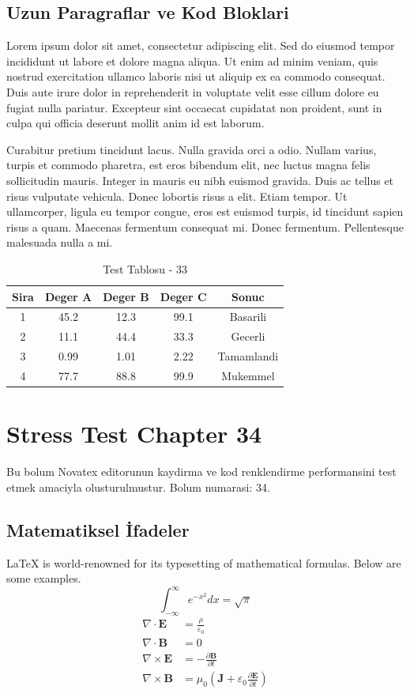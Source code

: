 \documentclass[12pt,a4paper]{article}
\begin{document}
\subsection{Uzun Paragraflar ve Kod Bloklari}
Lorem ipsum dolor sit amet, consectetur adipiscing elit. Sed do eiusmod tempor incididunt ut labore et dolore magna aliqua. Ut enim ad minim veniam, quis nostrud exercitation ullamco laboris nisi ut aliquip ex ea commodo consequat. Duis aute irure dolor in reprehenderit in voluptate velit esse cillum dolore eu fugiat nulla pariatur. Excepteur sint occaecat cupidatat non proident, sunt in culpa qui officia deserunt mollit anim id est laborum.

Curabitur pretium tincidunt lacus. Nulla gravida orci a odio. Nullam varius, turpis et commodo pharetra, est eros bibendum elit, nec luctus magna felis sollicitudin mauris. Integer in mauris eu nibh euismod gravida. Duis ac tellus et risus vulputate vehicula. Donec lobortis risus a elit. Etiam tempor. Ut ullamcorper, ligula eu tempor congue, eros est euismod turpis, id tincidunt sapien risus a quam. Maecenas fermentum consequat mi. Donec fermentum. Pellentesque malesuada nulla a mi.

\begin{table}[h!]
\centering
\begin{tabular}{|c|c|c|c|c|}
\hline
\textbf{Sira} & \textbf{Deger A} & \textbf{Deger B} & \textbf{Deger C} & \textbf{Sonuc} \\
\hline
1 & 45.2 & 12.3 & 99.1 & Basarili \\
2 & 11.1 & 44.4 & 33.3 & Gecerli \\
3 & 0.99 & 1.01 & 2.22 & Tamamlandi \\
4 & 77.7 & 88.8 & 99.9 & Mukemmel \\
\hline
\end{tabular}
\caption{Test Tablosu - 33}
\end{table}

\newpage
\section{Stress Test Chapter 34}
Bu bolum Novatex editorunun kaydirma ve kod renklendirme performansini test etmek amaciyla olusturulmustur. Bolum numarasi: 34.

\subsection{Matematiksel İfadeler}
\LaTeX{} is world-renowned for its typesetting of mathematical formulas. Below are some examples.
\begin{equation}
\int_{-\infty}^{\infty} e^{-x^2} dx = \sqrt{\pi}
\end{equation}
\begin{align}
\nabla \cdot \mathbf{E} &= \frac{\rho}{\varepsilon_0} \\
\nabla \cdot \mathbf{B} &= 0 \\
\nabla \times \mathbf{E} &= -\frac{\partial \mathbf{B}}{\partial t} \\
\nabla \times \mathbf{B} &= \mu_0\left(\mathbf{J} + \varepsilon_0 \frac{\partial \mathbf{E}}{\partial t}\right)
\end{align}
\end{document}

